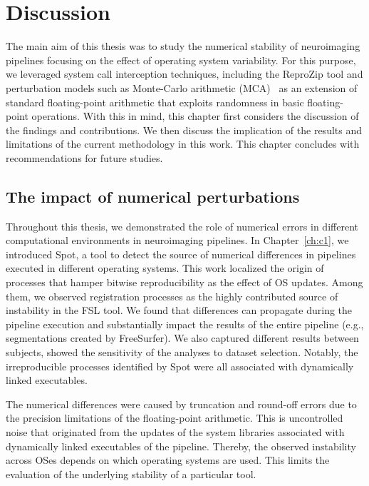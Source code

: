 \chapter{Discussion}
\label{ch:discussion}
\renewcommand\thesection{\@arabic\c@chapter.\@arabic\c@section}

The main aim of this thesis was to study the numerical stability of neuroimaging pipelines focusing on the effect
of operating system variability. For this purpose, we leveraged system call interception techniques, including
the ReproZip tool and perturbation models such as Monte-Carlo arithmetic (MCA)~\cite{Parker1997-qq} as an extension of
standard floating-point arithmetic that exploits randomness in basic floating-point operations.
With this in mind, this chapter first considers the discussion of the findings and contributions.
We then discuss the implication of the results and limitations of the current methodology in this work.
This chapter concludes with recommendations for future studies.


\section{The impact of numerical perturbations}

Throughout this thesis, we demonstrated the role of numerical errors in different computational environments in neuroimaging pipelines.
In Chapter~\ref{ch:c1}, we introduced Spot, a tool to detect the source of numerical differences in pipelines
executed in different operating systems. 
This work localized the origin of processes that hamper bitwise reproducibility as the effect of OS updates.
Among them, we observed registration processes as the highly contributed source of instability in the FSL tool. 
We found that differences can propagate during the pipeline execution and substantially impact
the results of the entire pipeline (e.g., segmentations created by FreeSurfer).
We also captured different results between subjects, showed the sensitivity of the analyses to dataset selection.
Notably, the irreproducible processes identified by Spot were all associated with dynamically linked executables.


The numerical differences were caused by truncation and round-off errors
due to the precision limitations of the floating-point arithmetic.
This is uncontrolled noise that originated from the updates of the system libraries associated with
dynamically linked executables of the pipeline. Thereby, the observed instability across OSes
depends on which operating systems are used. This limits the evaluation of the underlying stability of a particular tool.

